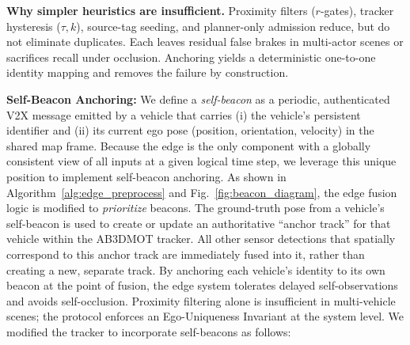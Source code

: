 \textbf{Why simpler heuristics are insufficient.}
Proximity filters ($r$-gates), tracker hysteresis ($\tau,k$), source-tag seeding, and planner-only admission reduce, but do not eliminate duplicates. Each leaves residual false brakes in multi-actor scenes or sacrifices recall under occlusion. Anchoring yields a deterministic one-to-one identity mapping and removes the failure by construction.



\textbf{Self-Beacon Anchoring:} We define a \emph{self-beacon} as a periodic, authenticated V2X message emitted by a vehicle that carries (i) the vehicle's persistent identifier and (ii) its current ego pose (position, orientation, velocity) in the shared map frame. Because the edge is the only component with a globally consistent view of all inputs at a given logical time step, we leverage this unique position to implement self-beacon anchoring. As shown in Algorithm~\ref{alg:edge_preprocess} and Fig.~\ref{fig:beacon_diagram}, the edge fusion logic is modified to \emph{prioritize} beacons. The ground-truth pose from a vehicle's self-beacon is used to create or update an authoritative ``anchor track'' for that vehicle within the AB3DMOT tracker.
All other sensor detections that spatially correspond to this anchor track are immediately fused into it, rather than creating a new, separate track. By anchoring each vehicle's identity to its own beacon at the point of fusion, the edge system tolerates delayed self-observations and avoids self-occlusion. Proximity filtering alone is insufficient in multi-vehicle scenes; the protocol enforces an Ego-Uniqueness Invariant at the system level. We modified the tracker to incorporate self-beacons as follows:


